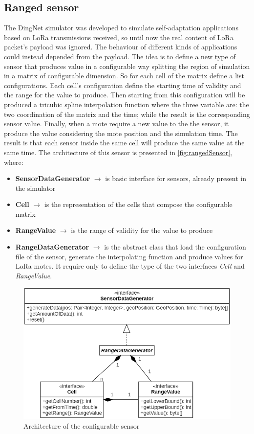 \subsection{Ranged sensor}
The DingNet simulator was developed to simulate self-adaptation applications based on LoRa transmissions received, so until now the real content of LoRa packet's payload was ignored.
The behaviour of different kinds of applications could instead depended from the payload. 
The idea is to define a new type of sensor that produces value in a configurable way splitting the region of simulation in a matrix of configurable dimension. 
So for each cell of the matrix define a list configurations. 
Each cell's configuration define the starting time of validity and the range for the value to produce. 
Then starting from this configuration will be produced a tricubic spline interpolation function where the three variable are: the two coordination of the matrix and the time; while the result is the corresponding sensor value.
Finally, when a mote require a new value to the the sensor, it produce the value considering the mote position and the simulation time.
The result is that each sensor inside the same cell will produce the same value at the same time. 
The architecture of this sensor is presented in \autoref{fig:rangedSensor}, where:
\begin{itemize}
    \item \textbf{SensorDataGenerator} $\rightarrow$ is basic interface for sensors, already present in the simulator
    \item \textbf{Cell} $\rightarrow$ is the representation of the cells that compose the configurable matrix
    \item \textbf{RangeValue} $\rightarrow$ is the range of validity for the value to produce
    \item \textbf{RangeDataGenerator} $\rightarrow$ is the abstract class that load the configuration file of the sensor, generate the interpolating function and produce values for LoRa motes. It require only to define the type of the two interfaces \textit{Cell} and \textit{RangeValue}.
\end{itemize}
% 
\begin{figure}[h]
    \centering
    \includegraphics[scale=0.7]{figures/rangedSensor.png}
    \caption{Architecture of the configurable sensor}
    \label{fig:rangedSensor}
\end{figure}
